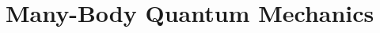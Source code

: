 \documentclass{beamer}[10]
\newcommand{\norm}[1]{\left\lVert #1 \right\rVert}
\newcommand{\dom}[1]{\mathcal D\left(#1\right)}
\renewcommand{\braket}[1]{\left\langle#1\right\rangle}
\newcommand{\R}{\mathbb{R}}
\newcommand{\C}{\mathbb{C}}
\begin{document}
\section{Many-Body Quantum Mechanics}
\end{document}
